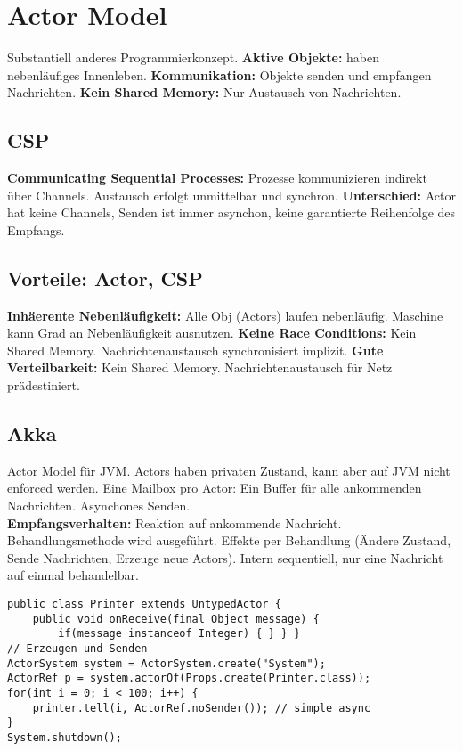 \section{Actor Model}
Substantiell anderes Programmierkonzept.
\textbf{Aktive Objekte:} haben nebenläufiges Innenleben.
\textbf{Kommunikation:} Objekte senden und empfangen Nachrichten.
\textbf{Kein Shared Memory:} Nur Austausch von Nachrichten.

\subsection{CSP}
\textbf{Communicating Sequential Processes:}
Prozesse kommunizieren indirekt über Channels. 
Austausch erfolgt unmittelbar und synchron.
\textbf{Unterschied:} Actor hat keine Channels, Senden ist immer asynchon, keine garantierte Reihenfolge des Empfangs.

\subsection{Vorteile: Actor, CSP} 
\textbf{Inhäerente Nebenläufigkeit:} Alle Obj (Actors) laufen nebenläufig.
Maschine kann Grad an Nebenläufigkeit ausnutzen.
\textbf{Keine Race Conditions:} Kein Shared Memory. Nachrichtenaustausch synchronisiert implizit.
\textbf{Gute Verteilbarkeit:} Kein Shared Memory. 
Nachrichtenaustausch für Netz prädestiniert.

\subsection{Akka}
Actor Model für JVM. Actors haben privaten Zustand, kann aber auf JVM nicht enforced werden.
Eine Mailbox pro Actor: Ein Buffer für alle ankommenden Nachrichten. Asynchones Senden.\\ 
\textbf{Empfangsverhalten:} Reaktion auf ankommende Nachricht. Behandlungsmethode wird ausgeführt.
Effekte per Behandlung (Ändere Zustand, Sende Nachrichten, Erzeuge neue Actors).
Intern sequentiell, nur eine Nachricht auf einmal behandelbar.
\begin{lstlisting}
public class Printer extends UntypedActor {
    public void onReceive(final Object message) {
        if(message instanceof Integer) { } } }
// Erzeugen und Senden
ActorSystem system = ActorSystem.create("System");
ActorRef p = system.actorOf(Props.create(Printer.class));
for(int i = 0; i < 100; i++) {
    printer.tell(i, ActorRef.noSender()); // simple async
}
System.shutdown();
\end{lstlisting}

